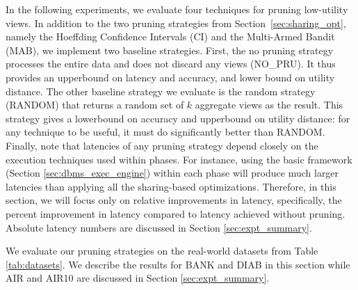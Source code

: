 In the following experiments, we evaluate four techniques for pruning low-utility views.
In addition to the two pruning strategies from Section~\ref{sec:sharing_opt}, 
namely the Hoeffding Confidence Intervals (CI) and the Multi-Armed Bandit (MAB),
we implement two baseline strategies.
First, the no pruning strategy processes the entire data and does not discard any views (NO\_PRU). 
It thus provides an upperbound on latency and accuracy, and lower bound on utility distance.
The other baseline strategy we evaluate is the random strategy (RANDOM) that returns a random 
set of $k$ aggregate views as the result.
This strategy gives a lowerbound on accuracy and upperbound on utility distance: for any 
technique to be useful, it must do significantly better than RANDOM.
Finally, note that latencies of any pruning strategy depend closely on the execution techniques 
used within phases. 
For instance, using the basic \SeeDB framework (Section \ref{sec:dbms_exec_engine}) within each phase
will produce much larger latencies than applying all the sharing-based optimizations.
Therefore, in this section, we will focus only on relative 
improvements in latency, specifically, the percent improvement in latency compared to latency
achieved without pruning.
Absolute latency numbers are discussed in Section \ref{sec:expt_summary}.


We evaluate our pruning strategies on the real-world datasets from Table \ref{tab:datasets}. 
We describe the results for BANK and DIAB in this section while AIR and AIR10 are discussed 
in Section \ref{sec:expt_summary}. 






